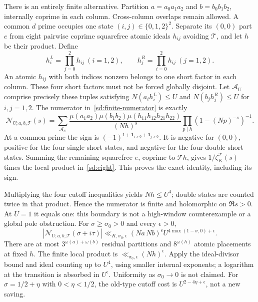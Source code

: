 \documentclass[11pt]{article}
\theoremstyle{definition}\newtheorem{definition}[theorem]{Definition}
\theoremstyle{remark}\newtheorem{remark}[theorem]{Remark}
\begin{document}
There is an entirely finite alternative. Partition
$a=a_0a_1a_2$ and $b=b_0b_1b_2$, internally coprime in each column.
Cross-column overlaps remain allowed. A common $d$ prime occupies one
state $(i,j)\in\{0,1,2\}^2$. Separate its $(0,0)$ part $e$ from eight
pairwise coprime squarefree atomic ideals $h_{ij}$ avoiding $\mathcal T$,
and let $h$ be their product. Define
\[
 h_i^L=\prod_{j=0}^2h_{ij}\ (i=1,2),\qquad
 h_j^R=\prod_{i=0}^2h_{ij}\ (j=1,2).
\]
An atomic $h_{ij}$ with both indices nonzero belongs to one short
factor in each column. These four short factors must not be forced
globally disjoint. Let $\mathcal A_U$ comprise precisely these tuples
satisfying
$N(a_i h_i^L)\le U$ and $N(b_jh_j^R)\le U$ for $i,j=1,2$.
The numerator in~\eqref{sd:finite-numerator} is exactly
\begin{equation}\label{sd:eight}
 \mathcal N_{U;a,b,\mathcal T}(s)=
 \sum_{\mathcal A_U}
 \frac{\mu(a_1a_2)\mu(b_1b_2)
       \mu(h_{11}h_{12}h_{21}h_{22})}{(Nh)^s}
       \prod_{p\mid h}(1-(Np)^{-s})^{-1}.
\end{equation}
At a common prime the sign is
$(-1)^{1+\mathbf1_{i>0}+\mathbf1_{j>0}}$.
It is negative for $(0,0)$, positive for the four single-short states,
and negative for the four double-short states. Summing the remaining
squarefree $e$, coprime to $\mathcal T h$, gives
$1/\zeta_K^{\mathcal T}(s)$ times the local product in~\eqref{sd:eight}.
This proves the exact identity, including its sign.

Multiplying the four cutoff inequalities yields $Nh\le U^4$; double
states are counted twice in that product. Hence the numerator is finite
and holomorphic on $\Re s>0$. At $U=1$ it equals one: this boundary is
not a high-window counterexample or a global pole obstruction.
For $\sigma\ge\sigma_0>0$ and every $\epsilon>0$,
\begin{equation}\label{sd:numerator-bound}
 |\mathcal N_{U;a,b,\mathcal T}(\sigma+i\tau)|
 \ll_{K,\sigma_0,\epsilon}(Na\,Nb)^\epsilon
               U^{4\max(1-\sigma,0)+\epsilon}.
\end{equation}
There are at most $3^{\omega(a)+\omega(b)}$ residual partitions and
$8^{\omega(h)}$ atomic placements at fixed $h$. The finite local product
is $\ll_{\sigma_0,\epsilon}(Nh)^\epsilon$. Apply the ideal-divisor bound
and ideal counting up to $U^4$, using smaller internal exponents; a
logarithm at the transition is absorbed in $U^\epsilon$.
Uniformity as $\sigma_0\to0$ is not claimed. For
$\sigma=1/2+\eta$ with $0<\eta<1/2$, the old-type cutoff cost is
$U^{2-4\eta+\epsilon}$, not a new saving.
\end{document}

